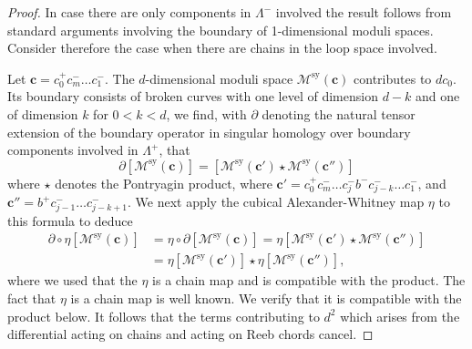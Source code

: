 \documentclass{gtpart}
\newcommand{\sy}{\mathrm{sy}}
\begin{document}
\begin{proof} 
In case there are only components in $\Lambda^{-}$ involved the result follows from standard arguments involving the boundary of 1-dimensional moduli spaces. Consider therefore the case when there are chains in the loop space involved. 

Let $\mathbf{c}=c_{0}^+ c_{m}^-\dots c_{1}^-$. The $d$-dimensional moduli space
$\mathcal{M}^{\sy}(\mathbf{c})$ contributes to $d c_{0}$. Its boundary consists
of broken curves with one level of dimension $d-k$ and one of dimension $k$ for
$0< k <d$, we find, with $\partial$ denoting the natural tensor extension of
the boundary operator in singular homology over boundary components involved in
    $\Lambda^{+}$, that \[ \partial [\mathcal{M}^{\sy}(\mathbf{c})] =
[\mathcal{M}^{\sy}(\mathbf{c}')\star \mathcal{M}^{\sy}(\mathbf{c}'')] \] where
$\star$ denotes the Pontryagin product, where $\mathbf{c}'=c_{0}^+ c_{m}^-\dots
c_{j}^{-} b^{-} c_{j-k}^{-}\dots c_{1}^{-}$, and  $\mathbf{c}''=
b^{+}c_{j-1}^-\dots c_{j-k+1}^{-}$.  We next apply the cubical
Alexander-Whitney map $\eta$ to this formula to deduce \begin{align*}
\partial\circ\eta[\mathcal{M}^{\sy}(\mathbf{c})]&=\eta\circ\partial[\mathcal{M}^{\sy}(\mathbf{c})]=\eta[\mathcal{M}^{\sy}(\mathbf{c}')\star
\mathcal{M}^{\sy}(\mathbf{c}'')]\\ &= \eta[\mathcal{M}^{\sy}(\mathbf{c}')]\star
\eta[\mathcal{M}^{\sy}(\mathbf{c}'')], \end{align*} where we used that the
$\eta$ is a chain map and is compatible with the product. The fact that $\eta$
is a chain map is well known. We verify that it is compatible with the product
below.  It follows that the terms contributing to $d^{2}$ which arises from the
differential acting on chains and acting on Reeb chords cancel.


\end{proof}
\end{document}
